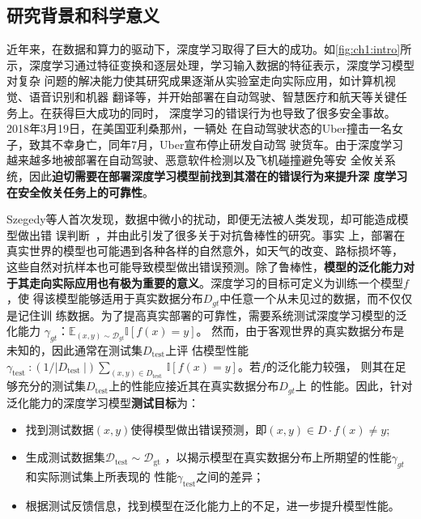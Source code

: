
\subsection{研究背景和科学意义}



%
近年来，在数据和算力的驱动下，深度学习取得了巨大的成功。如\cref{fig:ch1:intro}所
示，深度学习通过特征变换和逐层处理，学习输入数据的特征表示，深度学习模型对复杂
问题的解决能力使其研究成果逐渐从实验室走向实际应用，如计算机视觉、语音识别和机器
翻译等，并开始部署在自动驾驶、智慧医疗和航天等关键任务上。在获得巨大成功的同时，
深度学习的错误行为也导致了很多安全事故。2018年3月19日，在美国亚利桑那州，一辆处
在自动驾驶状态的Uber撞击一名女子，致其不幸身亡，同年7月，Uber宣布停止研发自动驾
驶货车。由于深度学习越来越多地被部署在自动驾驶、恶意软件检测以及飞机碰撞避免等安
全攸关系统，因此\textbf{迫切需要在部署深度学习模型前找到其潜在的错误行为来提升深
度学习在安全攸关任务上的可靠性}。

Szegedy等人首次发现，数据中微小的扰动，即便无法被人类发现，却可能造成模型做出错
误判断~\cite{szegedy2013intriguing}，并由此引发了很多关于对抗鲁棒性的研究。事实
上，部署在真实世界的模型也可能遇到各种各样的自然意外，如天气的改变、路标损坏等，
这些自然对抗样本也可能导致模型做出错误预测。除了鲁棒性，\textbf{模型的泛化能力对
于其走向实际应用也有极为重要的意义}。深度学习的目标可定义为训练一个模型${f}$，使
得该模型能够适用于真实数据分布$D_{gt}$中任意一个从未见过的数据，而不仅仅是记住训
练数据。为了提高真实部署的可靠性，需要系统测试深度学习模型的泛化能力
$\gamma_{gt}$：$\mathbb{E}_{(x, y) \sim \mathcal{D}_{g t}} \mathbb{I}[f(x)=y]$。
然而，由于客观世界的真实数据分布是未知的，因此通常在测试集$D_{\text{test}}$上评
估模型性能$\gamma_{\text {test }}:\left(1 /\left|D_{\text {test }}\right|\right)
\sum_{(x, y) \in D_{\text {test }}} \mathbb{I}[f(x)=y]$。若${f}$的泛化能力较强，
则其在足够充分的测试集$D_{\text{test}}$上的性能应接近其在真实数据分布$D_{gt}$上
的性能。因此，针对泛化能力的深度学习模型\textbf{测试目标}为：
\begin{itemize}
    \item 找到测试数据$(x, y)$使得模型做出错误预测，即$(x, y) \in D \cdot f(x)
    \neq y$;
    \item 生成测试数据集$\mathcal{D}_{\text{test}} \sim \mathcal{D}_{\text{gt}}$
    ，以揭示模型在真实数据分布上所期望的性能$\gamma_{gt}$和实际测试集上所表现的
    性能$\gamma_{\text{test}}$之间的差异；
    \item 根据测试反馈信息，找到模型在泛化能力上的不足，进一步提升模型性能。
\end{itemize}



